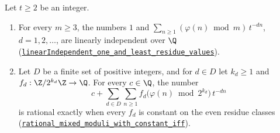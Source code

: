 \begin{prop}
\label{prop:dilations}
Let $t\ge2$ be an integer.
\begin{enumerate}[label=(\alph*),leftmargin=*]
\item For every $m\ge3$, the numbers $1$ and
  $\sum_{n\ge1}(\varphi(n)\bmod m)\,t^{-dn}$, $d=1,2,\ldots$, are linearly
  independent over $\Q$
  (\href{https://github.com/wcook04/plectis-erdos/blob/24edbddbe2bd68e920327a701aad0b9dd0d69675/lean/ErdosProblems/Erdos249/FiniteDilationLinearIndependent.lean\#L42}{\texttt{linearIndependent\_one\_and\_least\_residue\_values}}).
\item Let $D$ be a finite set of positive integers, and for $d\in D$ let
  $k_d\ge1$ and $f_d:\Z/2^{k_d}\Z\to\Q$. For every $c\in\Q$, the number
  \[
   c+\sum_{d\in D}\sum_{n\ge1}f_d\bigl(\varphi(n)\bmod2^{k_d}\bigr)\,t^{-dn}
  \]
  is rational exactly when every $f_d$ is constant on the even residue
  classes
  (\href{https://github.com/wcook04/plectis-erdos/blob/24edbddbe2bd68e920327a701aad0b9dd0d69675/lean/ErdosProblems/Erdos249/FiniteDilationMixedModuli.lean\#L95}{\texttt{rational\_mixed\_moduli\_with\_constant\_iff}}).
\end{enumerate}
\end{prop}

